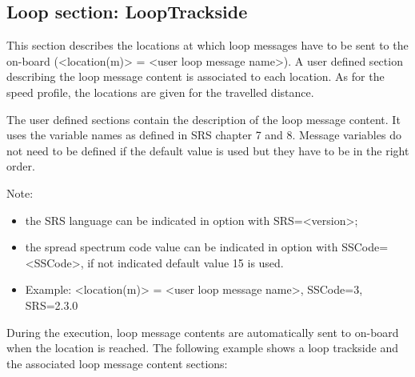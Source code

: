 \subsection{Loop  section: LoopTrackside}

	This section describes the locations at which loop messages have to be sent to the on-board (<location(m)> = <user loop message name>). A user defined section describing the loop message content is associated to each location. As for the speed profile, the locations are given for the travelled distance.

	The user defined sections contain the description of the loop message content. It uses the variable names as defined in SRS chapter 7 and 8. Message variables do not need to be defined if the default value is used but they have to be in the right order.

	Note:

	\begin{itemize}
		\item the SRS language can be indicated in option with SRS=<version>;
		\item the spread spectrum code value can be indicated in option with SSCode=<SSCode>, if not indicated default value 15 is used.
		\item Example: <location(m)> = <user loop message name>, SSCode=3, SRS=2.3.0

	\end{itemize}

	During the execution, loop message contents are automatically sent to on-board when the location is reached.
	The following example shows a loop trackside and the associated loop message content sections:

